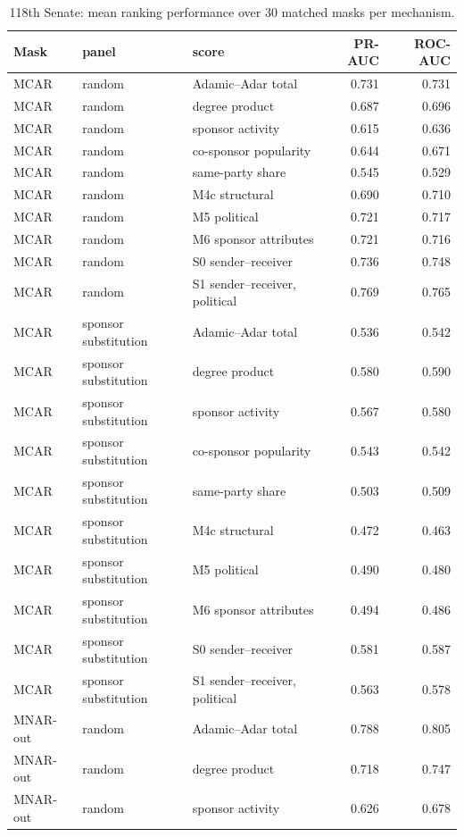 \begin{table}[tbp]
\centering
\small
\caption{118th Senate: mean ranking performance over 30 matched masks per mechanism.}
\label{tab:senate-performance}
\begin{tabular}{lllrr}
\toprule
Mask & panel & score & PR-AUC & ROC-AUC \\
\midrule
MCAR & random & Adamic--Adar total & 0.731 & 0.731 \\
MCAR & random & degree product & 0.687 & 0.696 \\
MCAR & random & sponsor activity & 0.615 & 0.636 \\
MCAR & random & co-sponsor popularity & 0.644 & 0.671 \\
MCAR & random & same-party share & 0.545 & 0.529 \\
MCAR & random & M4c structural & 0.690 & 0.710 \\
MCAR & random & M5 political & 0.721 & 0.717 \\
MCAR & random & M6 sponsor attributes & 0.721 & 0.716 \\
MCAR & random & S0 sender--receiver & 0.736 & 0.748 \\
MCAR & random & S1 sender--receiver, political & 0.769 & 0.765 \\
MCAR & sponsor substitution & Adamic--Adar total & 0.536 & 0.542 \\
MCAR & sponsor substitution & degree product & 0.580 & 0.590 \\
MCAR & sponsor substitution & sponsor activity & 0.567 & 0.580 \\
MCAR & sponsor substitution & co-sponsor popularity & 0.543 & 0.542 \\
MCAR & sponsor substitution & same-party share & 0.503 & 0.509 \\
MCAR & sponsor substitution & M4c structural & 0.472 & 0.463 \\
MCAR & sponsor substitution & M5 political & 0.490 & 0.480 \\
MCAR & sponsor substitution & M6 sponsor attributes & 0.494 & 0.486 \\
MCAR & sponsor substitution & S0 sender--receiver & 0.581 & 0.587 \\
MCAR & sponsor substitution & S1 sender--receiver, political & 0.563 & 0.578 \\
MNAR-out & random & Adamic--Adar total & 0.788 & 0.805 \\
MNAR-out & random & degree product & 0.718 & 0.747 \\
MNAR-out & random & sponsor activity & 0.626 & 0.678 \\

\end{tabular}
\end{table}
